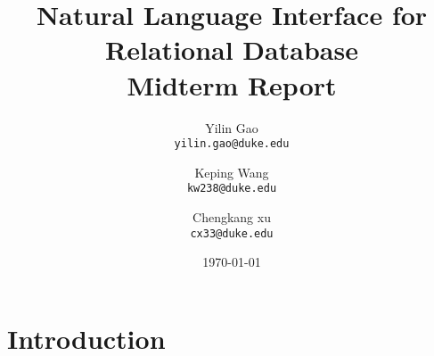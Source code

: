 \documentclass[twocolumn]{article}
\begin{document}
\title{Natural Language Interface for Relational Database\\
	\small{Midterm Report}}

\author{Yilin Gao \\
	\small \texttt{yilin.gao@duke.edu} \and 
	Keping Wang \\
	\small \texttt{kw238@duke.edu} \and 
	Chengkang xu \\
	\small \texttt{cx33@duke.edu} }
	
\date{\today}
\maketitle

\section{Introduction}\label{sec:introduction}
\end{document}
